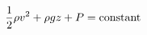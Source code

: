 

\vspace*{\fill}
\centering

\begin{align*}
    \frac{1}{2}\rho v^2 + \rho gz + P = {\rm constant}
\end{align*}

\centering
\vspace*{\fill}

